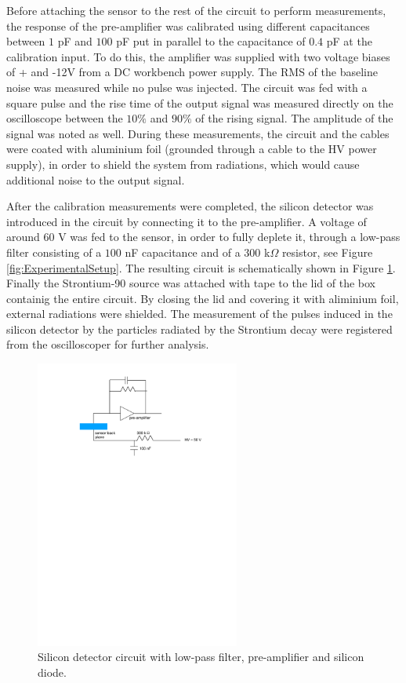 \documentclass[12pt]{article}
\begin{document}
Before attaching the sensor to the rest of the circuit to perform measurements, the response of the pre-amplifier was calibrated using different capacitances between $1$ pF and $100$ pF put in parallel to the capacitance of $0.4$ pF at the calibration input. To do this, the amplifier was supplied with two voltage biases of + and -12V from a DC workbench power supply. The RMS of the baseline noise was measured while no pulse was injected. The circuit was fed with a square pulse and the rise time of the output signal was measured directly on the oscilloscope between the $10\%$ and $90\%$ of the rising signal. The amplitude of the signal was noted as well. During these measurements, the circuit and the cables were coated with aluminium foil (grounded through a cable to the HV power supply), in order to shield the system from radiations, which would cause additional noise to the output signal.

After the calibration measurements were completed, the silicon detector was introduced in the circuit by connecting it to the pre-amplifier. A voltage of around $60$ V was fed to the sensor, in order to fully deplete it, through a low-pass filter consisting of a $100$ nF capacitance and of a $300$ k$\Omega$ resistor, see Figure \ref{fig:ExperimentalSetup}. The resulting circuit is schematically shown in Figure \ref{fig:SiliconDiodeCircuit}.
Finally the Strontium-90 source was attached with tape to the lid of the box containig the entire circuit. By closing the lid and covering it with aliminium foil, external radiations were shielded. The measurement of the pulses induced in the silicon detector by the particles radiated by the Strontium decay were registered from the oscilloscoper for further analysis.

\begin{figure}[htb]
  \centering
  \includegraphics[width=0.6\textwidth]{./graphics/SiliconDiodeCircuit}
  \caption{Silicon detector circuit with low-pass filter, pre-amplifier and silicon diode.}
  \label{fig:SiliconDiodeCircuit}
\end{figure}
\end{document}

